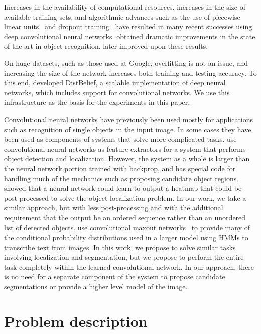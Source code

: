 \documentclass{article} \usepackage{comment}
\begin{document}
Increases in the availability of computational resources, increases in the size of available training sets, and
algorithmic advances such as the use of piecewise linear units~\citep{Jarrett-ICCV2009,Glorot+al-AI-2011,Goodfellow-et-al-ICML2013}
and dropout training~\citep{Hinton-et-al-arxiv2012} have resulted in many recent successes using deep convolutional
neural networks. \citet{Krizhevsky-2012-small} obtained dramatic improvements in the state of the art in object recognition.
\citet{Zeiler-Fergus-arxiv2013} later improved upon these results.

On huge datasets, such as those used at Google, overfitting is not an issue, and increasing the size of the network
increases both training and testing accuracy. To this end, \citet{Dean-et-al-NIPS2012} developed DistBelief,
a scalable implementation of deep neural networks, which includes support for convolutional networks.
We use this infrastructure as the basis for the experiments in this paper.

Convolutional neural networks have previously been used mostly for applications such as recognition of single
objects in the input image. In some cases they have been used as components of systems that solve more complicated
tasks. \citet{Girshick-et-al-arxiv2013} use convolutional neural networks as feature extractors for a system that
performs object detection and localization. However, the system as a whole is larger than the neural network portion
trained with backprop, and has special code for handling much of the mechanics such as proposing candidate object
regions. \citet{Szegedy-nips2013} showed that a neural network could learn to output a heatmap that could be
post-processed to solve the object localization problem. In our work, we take a similar approach, but with less
post-processing and with the additional requirement that the output be an ordered sequence rather than an unordered
list of detected objects.
\citet{Alsharif-Pineau-arxiv2013} use convolutional maxout networks~\citep{Goodfellow-et-al-ICML2013} to
provide many of the conditional probability distributions used in a larger model using HMMs to transcribe text from
images. In this work, we propose to solve similar tasks involving localization and segmentation, but we propose to
perform the entire task completely within the learned convolutional network. In our approach, there is no need for
a separate component of the system to propose candidate segmentations or provide a higher level model of the image.

\section{Problem description}
\label{sec:problem}
\end{document}
